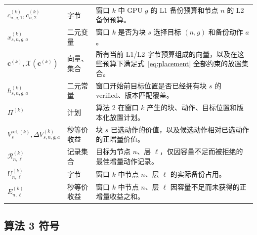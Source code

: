 \documentclass[UTF8,11pt,a4paper,fontset=fandol]{ctexart}
\begin{document}
\begin{longtable}{p{}p{}p{}}
  $c_{n,g,1}^{(k)},c_{n,2}^{(k)}$ & 字节
    & 窗口 $k$ 中 GPU $g$ 的 L1 备份预算和节点 $n$ 的 L2 备份预算。 \\
  $x_{s,n,g,a}^{(k)}$ & 二元变量
    & 窗口 $k$ 是否为块 $s$ 选择目标 $(n,g)$ 和备份动作 $a$。 \\
  $\mathbf c^{(k)},\mathcal X(\mathbf c^{(k)})$ & 向量、集合
    & 所有当前 L1/L2 字节预算组成的向量，以及在这些预算下满足式~\eqref{eq:placement}
      全部约束的放置集合。 \\
  $h_{s,n,g,a}^{(k)}$ & 二元常量
    & 窗口开始前目标位置是否已经拥有块 $s$ 的 verified、版本匹配覆盖。 \\
  $\Pi^{(k)}$ & 计划
    & 算法 2 在窗口 $k$ 产生的块、动作、目标位置和版本化放置计划。 \\
  $V_s^{\mathrm{sel},(k)},\Delta V_{s,n,g,a}^{(k)}$ & 秒等价收益
    & 块 $s$ 已选动作的价值，以及候选动作相对已选动作的正增量价值。 \\
  $\mathcal R_{n,\ell}^{(k)}$ & 记录集合
    & 目标为节点 $n$、层 $\ell$，仅因容量不足而被拒绝的最佳增量动作记录。 \\
  $U_{n,\ell}^{(k)}$ & 字节
    & 窗口 $k$ 中节点 $n$、层 $\ell$ 的实际备份占用。 \\
  $E_{n,\ell}^{(k)}$ & 秒等价收益
    & 窗口 $k$ 中节点 $n$、层 $\ell$ 因容量不足而未获得的正增量收益之和。 \\
  \bottomrule
\end{longtable}

\subsection{算法 3 符号}
\end{document}
